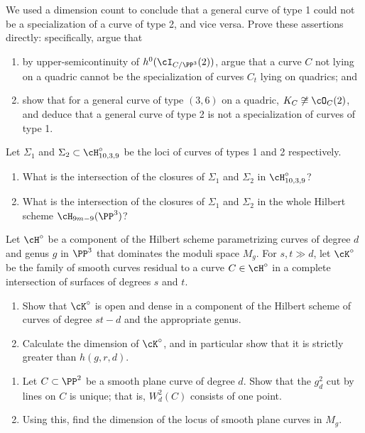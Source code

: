 \begin{exercise}
 We used a dimension count to conclude that a general curve of type 1 could not be a specialization of a curve of type 2, and vice versa. Prove these assertions directly: specifically, argue that
\begin{enumerate}
\item by upper-semicontinuity of $h^0(\cI_{C/\PP^3}(2))$, argue that a curve $C$ not lying on a quadric cannot be the specialization of curves $C_t$ lying on quadrics; and
\item show that for a general curve of type $(3,6)$ on a quadric, $K_C \not\cong \cO_C(2)$, and deduce that a general curve of type 2 is not a specialization of curves of type 1.
\end{enumerate}
\end{exercise}

\begin{exercise}
Let $\Sigma_1$ and $\Sigma_2 \subset \cH^\circ_{10,3,9}$ be the loci of curves of types 1 and 2 respectively. 
\begin{enumerate}
\item What is the intersection of the closures of $\Sigma_1$ and $\Sigma_2$ in $ \cH^\circ_{10,3,9}$?
\item What is the intersection of the closures of $\Sigma_1$ and $\Sigma_2$ in the whole Hilbert scheme $\cH_{9m-9}(\PP^3)$?
\end{enumerate}
\end{exercise}


\begin{exercise}\label{many large components}
Let $\cH^\circ$ be a component of the Hilbert scheme parametrizing curves of degree $d$ and genus $g$ in $\PP^3$ that dominates the moduli space $M_g$. For $s, t \gg d$, let $\cK^\circ$ be the family of smooth curves residual to a curve $C \in  \cH^\circ$ in a complete intersection of surfaces of degrees $s$ and $t$.
\begin{enumerate}
\item Show that $\cK^\circ$ is open and dense in a component of the Hilbert scheme of curves of degree $st-d$ and the appropriate genus.
\item Calculate the dimension of $\cK^\circ$, and in particular show that it is strictly greater than $h(g,r,d)$.
\end{enumerate}
\end{exercise}

\begin{exercise}\label{moduli of plane curves}
\begin{enumerate}
\item Let $C \subset \PP^2$ be a smooth plane curve of degree $d$. Show that the $g^2_d$ cut by lines on $C$ is unique; that is, $W^2_d(C)$ consists of one point.
\item Using this, find the dimension of the locus of smooth plane curves in $M_g$.
\end{enumerate}
\end{exercise}

